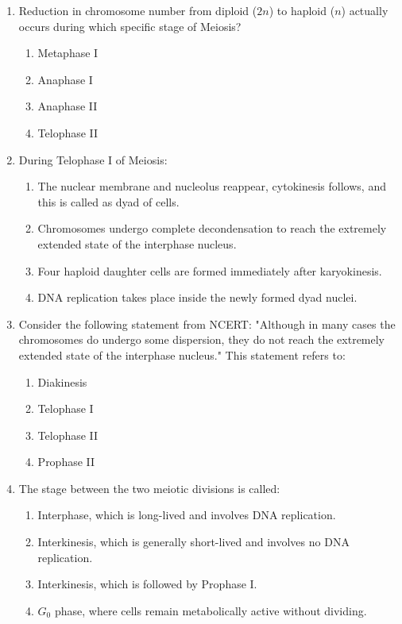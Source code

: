 \documentclass[11pt,a4paper]{article}
\begin{document}
\begin{enumerate}[label=\textbf{\arabic*.}]
\item Reduction in chromosome number from diploid ($2n$) to haploid ($n$) actually occurs during which specific stage of Meiosis?
\begin{enumerate}[label=(\Alph*)]
    \item Metaphase I
    \item Anaphase I
    \item Anaphase II
    \item Telophase II
\end{enumerate}

\item During Telophase I of Meiosis:
\begin{enumerate}[label=(\Alph*)]
    \item The nuclear membrane and nucleolus reappear, cytokinesis follows, and this is called as dyad of cells.
    \item Chromosomes undergo complete decondensation to reach the extremely extended state of the interphase nucleus.
    \item Four haploid daughter cells are formed immediately after karyokinesis.
    \item DNA replication takes place inside the newly formed dyad nuclei.
\end{enumerate}

\item Consider the following statement from NCERT: "Although in many cases the chromosomes do undergo some dispersion, they do not reach the extremely extended state of the interphase nucleus." This statement refers to:
\begin{enumerate}[label=(\Alph*)]
    \item Diakinesis
    \item Telophase I
    \item Telophase II
    \item Prophase II
\end{enumerate}

\item The stage between the two meiotic divisions is called:
\begin{enumerate}[label=(\Alph*)]
    \item Interphase, which is long-lived and involves DNA replication.
    \item Interkinesis, which is generally short-lived and involves no DNA replication.
    \item Interkinesis, which is followed by Prophase I.
    \item $G_0$ phase, where cells remain metabolically active without dividing.
\end{enumerate}


\end{enumerate}
\end{document}
